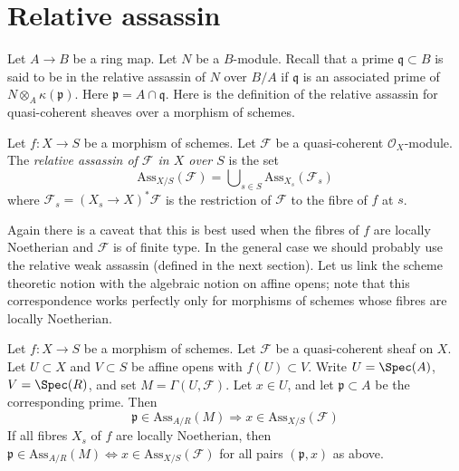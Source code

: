 \section{Relative assassin}
\label{section-relative-assassin}

\noindent
Let $A \to B$ be a ring map. Let $N$ be a $B$-module. Recall that
a prime $\mathfrak q \subset B$ is said to be in the relative assassin
of $N$ over $B/A$ if $\mathfrak q$ is an associated prime of
$N \otimes_A \kappa(\mathfrak p)$. Here $\mathfrak p = A \cap \mathfrak q$.
Here is the definition of the relative assassin for quasi-coherent
sheaves over a morphism of schemes.

\begin{definition}
\label{definition-relative-assassin}
Let $f : X \to S$ be a morphism of schemes.
Let $\mathcal{F}$ be a quasi-coherent $\mathcal{O}_X$-module.
The {\it relative assassin of $\mathcal{F}$ in $X$ over $S$}
is the set
$$
\text{Ass}_{X/S}(\mathcal{F}) =
\bigcup\nolimits_{s \in S} \text{Ass}_{X_s}(\mathcal{F}_s)
$$
where $\mathcal{F}_s = (X_s \to X)^*\mathcal{F}$ is the restriction
of $\mathcal{F}$ to the fibre of $f$ at $s$.
\end{definition}

\noindent
Again there is a caveat that this is best used when the fibres of $f$
are locally Noetherian and $\mathcal{F}$ is of finite type. In the general
case we should probably use the relative weak assassin (defined in the next
section). Let us link the scheme theoretic notion with the algebraic notion
on affine opens; note that this correspondence works perfectly only
for morphisms of schemes whose fibres are locally Noetherian.

\begin{lemma}
\label{lemma-relative-assassin-affine-open}
Let $f : X \to S$ be a morphism of schemes.
Let $\mathcal{F}$ be a quasi-coherent sheaf on $X$.
Let $U \subset X$ and $V \subset S$ be affine opens
with $f(U) \subset V$. Write $U = \Spec(A)$, $V = \Spec(R)$, and set
$M = \Gamma(U, \mathcal{F})$.
Let $x \in U$, and let $\mathfrak p \subset A$ be the corresponding prime.
Then
$$
\mathfrak p \in \text{Ass}_{A/R}(M) \Rightarrow
x \in \text{Ass}_{X/S}(\mathcal{F})
$$
If all fibres $X_s$ of $f$ are locally Noetherian, then
$\mathfrak p \in \text{Ass}_{A/R}(M) \Leftrightarrow
x \in \text{Ass}_{X/S}(\mathcal{F})$
for all pairs $(\mathfrak p, x)$ as above.
\end{lemma}

